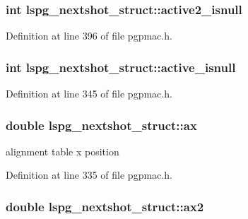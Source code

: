 \hypertarget{structlspg__nextshot__struct_a1aa11ff4a4c8d69695786b4349e84e6b}{
\subsubsection[{active2\-\_\-isnull}]{\setlength{\rightskip}{0pt plus 5cm}int lspg\-\_\-nextshot\-\_\-struct\-::active2\-\_\-isnull}}\label{structlspg__nextshot__struct_a1aa11ff4a4c8d69695786b4349e84e6b}


Definition at line 396 of file pgpmac.\-h.

\hypertarget{structlspg__nextshot__struct_a9f777671ec617a0f533b3c51f28babb3}{
\subsubsection[{active\-\_\-isnull}]{\setlength{\rightskip}{0pt plus 5cm}int lspg\-\_\-nextshot\-\_\-struct\-::active\-\_\-isnull}}\label{structlspg__nextshot__struct_a9f777671ec617a0f533b3c51f28babb3}


Definition at line 345 of file pgpmac.\-h.

\hypertarget{structlspg__nextshot__struct_a7f57874223897ab7d9c7531a9522904d}{
\subsubsection[{ax}]{\setlength{\rightskip}{0pt plus 5cm}double lspg\-\_\-nextshot\-\_\-struct\-::ax}}\label{structlspg__nextshot__struct_a7f57874223897ab7d9c7531a9522904d}


alignment table x position 



Definition at line 335 of file pgpmac.\-h.

\hypertarget{structlspg__nextshot__struct_ab76bd38d2a098bc7eda82aff5dcb9c66}{
\subsubsection[{ax2}]{\setlength{\rightskip}{0pt plus 5cm}double lspg\-\_\-nextshot\-\_\-struct\-::ax2}}\label{structlspg__nextshot__struct_ab76bd38d2a098bc7eda82aff5dcb9c66}


